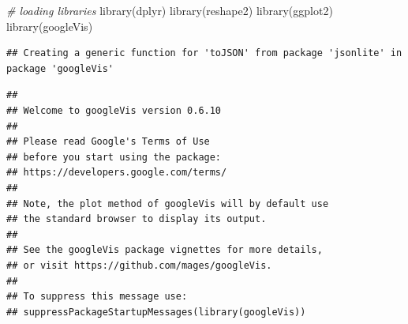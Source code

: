 \documentclass[
]{book}
\newenvironment{Shaded}{\begin{snugshade}}{\end{snugshade}}
\newcommand{\CommentTok}[1]{\textcolor[rgb]{0.56,0.35,0.01}{\textit{#1}}}
\newcommand{\FunctionTok}[1]{\textcolor[rgb]{0.00,0.00,0.00}{#1}}
\newcommand{\NormalTok}[1]{#1}
\begin{document}
\begin{Shaded}
\begin{Highlighting}[]
\CommentTok{\# loading libraries}
\FunctionTok{library}\NormalTok{(dplyr)}
\FunctionTok{library}\NormalTok{(reshape2)}
\FunctionTok{library}\NormalTok{(ggplot2)}
\FunctionTok{library}\NormalTok{(googleVis)}
\end{Highlighting}
\end{Shaded}

\begin{verbatim}
## Creating a generic function for 'toJSON' from package 'jsonlite' in package 'googleVis'
\end{verbatim}

\begin{verbatim}
## 
## Welcome to googleVis version 0.6.10
## 
## Please read Google's Terms of Use
## before you start using the package:
## https://developers.google.com/terms/
## 
## Note, the plot method of googleVis will by default use
## the standard browser to display its output.
## 
## See the googleVis package vignettes for more details,
## or visit https://github.com/mages/googleVis.
## 
## To suppress this message use:
## suppressPackageStartupMessages(library(googleVis))
\end{verbatim}
\end{document}
